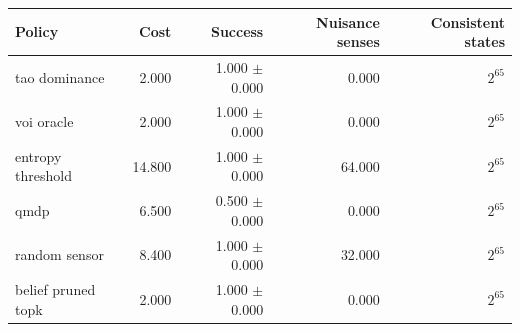 \begin{tabular}{lrrrr}
\toprule
Policy & Cost & Success & Nuisance senses & Consistent states \\
\midrule
tao dominance & 2.000 & 1.000 $\pm$ 0.000 & 0.000 & $2^{65}$ \\
voi oracle & 2.000 & 1.000 $\pm$ 0.000 & 0.000 & $2^{65}$ \\
entropy threshold & 14.800 & 1.000 $\pm$ 0.000 & 64.000 & $2^{65}$ \\
qmdp & 6.500 & 0.500 $\pm$ 0.000 & 0.000 & $2^{65}$ \\
random sensor & 8.400 & 1.000 $\pm$ 0.000 & 32.000 & $2^{65}$ \\
belief pruned topk & 2.000 & 1.000 $\pm$ 0.000 & 0.000 & $2^{65}$ \\
\bottomrule
\end{tabular}

